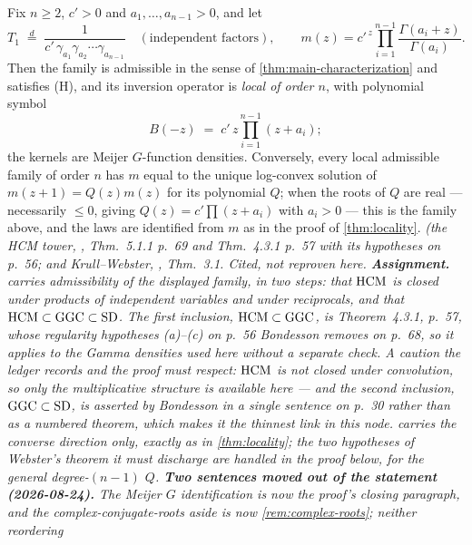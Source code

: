 \begin{proposition}\label{prop:local-ladder}
Fix $n \ge 2$, $c' > 0$ and $a_1, \dots, a_{n-1} > 0$, and let
\[
  T_1 \;\stackrel{d}{=}\; \frac{1}{c'\,\gamma_{a_1}\gamma_{a_2}\cdots\gamma_{a_{n-1}}}
  \quad (\text{independent factors}), \qquad
  m(z) = c'^{\,z}\prod_{i=1}^{n-1}\frac{\Gamma(a_i + z)}{\Gamma(a_i)} .
\]
Then the family is admissible in the sense of \ref{thm:main-characterization} and satisfies
(H), and its inversion operator is \emph{local of order $n$}, with polynomial symbol
\[
  B(-z) \;=\; c'\,z\prod_{i=1}^{n-1}(z + a_i);
\]
the kernels are Meijer $G$-function densities. Conversely, every local admissible family of
order $n$ has $m$ equal to the unique log-convex solution of $m(z+1) = Q(z)m(z)$ for its
polynomial $Q$; when the roots of $Q$ are real --- necessarily $\le 0$, giving
$Q(z) = c'\prod(z+a_i)$ with $a_i > 0$ --- this is the family above, and the laws are
identified from $m$ as in the proof of \ref{thm:locality}.
\statusA\quad{}\quad{}\quad\emph{(the HCM tower,
, Thm.~5.1.1 p.~69 and Thm.~4.3.1 p.~57 with its hypotheses
on p.~56; and Krull--Webster, , Thm.~3.1. Cited, not reproven here.
\textbf{Assignment.}  carries admissibility of the displayed family, in two steps:
that $\mathrm{HCM}$ is closed under products of independent variables and under reciprocals, and that
$\mathrm{HCM} \subset \mathrm{GGC} \subset \mathrm{SD}$. The first inclusion, $\mathrm{HCM} \subset \mathrm{GGC}$, is
Theorem~4.3.1, p.~57, whose regularity hypotheses (a)--(c) on p.~56 Bondesson removes on p.~68,
so it applies to the Gamma densities used here without a separate check. A caution the ledger
records and the proof must respect:
$\mathrm{HCM}$ is \emph{not} closed under convolution, so only the multiplicative structure is
available here --- and the second inclusion, $\mathrm{GGC} \subset \mathrm{SD}$, is asserted by Bondesson
in a single sentence on p.~30 rather than as a numbered theorem, which makes it the thinnest
link in this node.  carries the converse direction only, exactly as in
\ref{thm:locality}; the two hypotheses of Webster's theorem it must discharge are handled in
the proof below, for the general degree-$(n-1)$ $Q$. \textbf{Two sentences moved out of the
statement (2026-08-24).} The Meijer $G$ identification is now the proof's closing paragraph,
and the complex-conjugate-roots aside is now \ref{rem:complex-roots}; neither reordering
}
\end{proposition}
